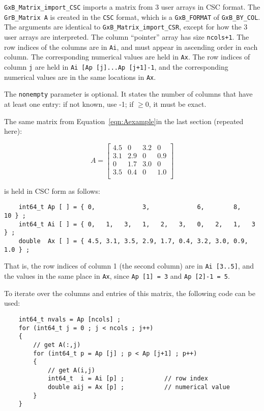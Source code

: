 \documentclass[12pt]{article}
\begin{document}
\verb'GxB_Matrix_import_CSC' imports a matrix from 3 user arrays in CSC format.
The \verb'GrB_Matrix A' is created in the \verb'CSC' format, which is a
\verb'GxB_FORMAT' of \verb'GxB_BY_COL'.  The arguments are identical to
\verb'GxB_Matrix_import_CSR', except for how the 3 user arrays are
interpreted.  The column ``pointer'' array has size \verb'ncols+1'.  The row
indices of the columns are in \verb'Ai', and must appear in ascending order in
each column.  The corresponding numerical values are held in \verb'Ax'.  The
row indices of column \verb'j' are held in \verb'Ai [Ap [j]...Ap [j+1]-1',
and the corresponding numerical values are in the same locations in \verb'Ax'.

The \verb'nonempty' parameter is optional.  It states the number of columns
that have at least one entry: if not known, use -1;
if $\ge 0$, it must be exact.

The same matrix from Equation~\ref{eqn:Aexample}in
the last section (repeated here):

    \begin{equation}
    A = \left[
    \begin{array}{cccc}
    4.5 &   0 & 3.2 &   0 \\
    3.1 & 2.9 &  0  & 0.9 \\
     0  & 1.7 & 3.0 &   0 \\
    3.5 & 0.4 &  0  & 1.0 \\
    \end{array}
    \right]
    \end{equation}

is held in CSC form as follows:

{\footnotesize
\begin{verbatim}
    int64_t Ap [ ] = { 0,             3,             6,        8,       10 } ;
    int64_t Ai [ ] = { 0,   1,   3,   1,   2,   3,   0,   2,   1,   3   } ;
    double  Ax [ ] = { 4.5, 3.1, 3.5, 2.9, 1.7, 0.4, 3.2, 3.0, 0.9, 1.0 } ; \end{verbatim} }

That is, the row indices of column 1 (the second column) are in
\verb'Ai [3..5]', and the values in the same place in \verb'Ax',
since \verb'Ap [1] = 3' and \verb'Ap [2]-1 = 5'.

To iterate over the columns and entries of this matrix, the following code can
be used:

    {\footnotesize
    \begin{verbatim}
    int64_t nvals = Ap [ncols] ;
    for (int64_t j = 0 ; j < ncols ; j++)
    {
        // get A(:,j)
        for (int64_t p = Ap [j] ; p < Ap [j+1] ; p++)
        {
            // get A(i,j)
            int64_t  i = Ai [p] ;           // row index
            double aij = Ax [p] ;           // numerical value
        }
    } \end{verbatim}}
\end{document}
